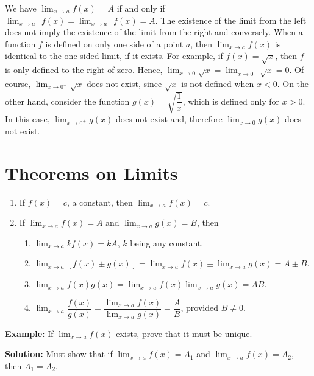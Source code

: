 \documentclass[titlepage,a4paper,12pt]{report}
\begin{document}
 \noindent We have $\displaystyle \lim _{x\rightarrow a} f(x)=A$ if and only if  $\displaystyle \lim _{x\rightarrow a^+} f(x)=\displaystyle \lim _{x\rightarrow a^-} f(x)=A$. The existence of the limit from the left does not imply the existence of the limit from the right and conversely. When a function $f$ is defined on only one side of a point $a$, then $\displaystyle \lim _{x\rightarrow a} f(x)$ is identical to the one-sided limit, if it exists. For example, if $f(x)=\sqrt{x}$, then $f$ is only defined to the right of zero. Hence, $\displaystyle \lim _{x\rightarrow 0}\sqrt{x}=\lim _{x\rightarrow 0^+}\sqrt{x}=0$. Of course, $\displaystyle \lim _{x\rightarrow 0^-}\sqrt{x}$ does not exist, since $\sqrt{x}$ is not defined when $x<0$. On the other hand, consider the function $g(x)=\sqrt{\dfrac{1}{x}}$, which is defined only for $x>0$. In this case, $\displaystyle \lim _{x\rightarrow 0^+} g(x)$ does not exist and, therefore $\displaystyle \lim _{x\rightarrow 0} g(x)$ does not exist.
 
\section{Theorems on Limits}
\begin{enumerate}
\item If $f(x)=c$, a constant, then $\displaystyle \lim _{x\rightarrow a} f(x)=c$.
\item If $\displaystyle \lim _{x\rightarrow a} f(x)=A$ and $\displaystyle \lim _{x\rightarrow a} g(x)=B$, then 
\begin{enumerate}
\item $\displaystyle \lim _{x\rightarrow a} kf(x)=kA$, $k$ being any constant.
\item $\displaystyle \lim _{x\rightarrow a} [f(x)\pm g(x)]=\displaystyle \lim _{x\rightarrow a} f(x) \pm \displaystyle \lim _{x\rightarrow a} g(x)=A\pm B$.
\item $\displaystyle \lim _{x\rightarrow a} f(x)g(x)=\displaystyle \lim _{x\rightarrow a} f(x)\displaystyle \lim _{x\rightarrow a} g(x)=AB$.
\item $\displaystyle \lim _{x\rightarrow a} \dfrac{f(x)}{g(x)}=\dfrac{\displaystyle \lim _{x\rightarrow a} f(x)}{\displaystyle \lim _{x\rightarrow a} g(x)}=\dfrac{A}{B}$, provided $B\neq 0$.
\end{enumerate}
\end{enumerate}
\textbf{Example:} If $\displaystyle \lim _{x\rightarrow a} f(x)$ exists, prove that it must be unique.

\noindent \textbf{Solution:} Must show that if $\displaystyle \lim _{x\rightarrow a} f(x)=A_1$ and $\displaystyle \lim _{x\rightarrow a} f(x)=A_2$, then $A_1=A_2$. 
\end{document}
